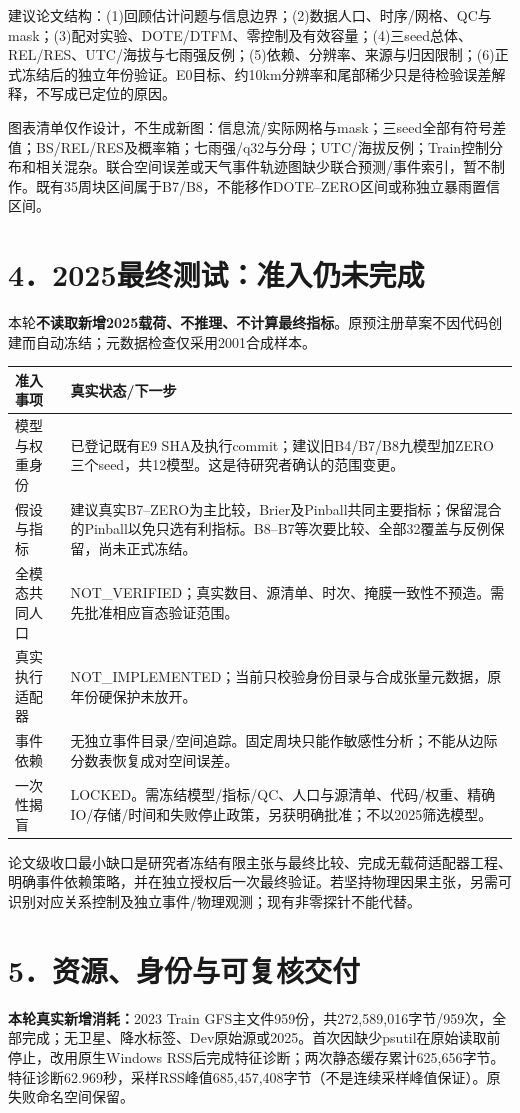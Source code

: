 \documentclass[UTF8,a4paper,10pt,fontset=none]{ctexart}
\begin{document}
建议论文结构：(1)回顾估计问题与信息边界；(2)数据人口、时序/网格、QC与mask；(3)配对实验、DOTE/DTFM、零控制及有效容量；(4)三seed总体、REL/RES、UTC/海拔与七雨强反例；(5)依赖、分辨率、来源与归因限制；(6)正式冻结后的独立年份验证。E0目标、约10km分辨率和尾部稀少只是待检验误差解释，不写成已定位的原因。

图表清单仅作设计，不生成新图：信息流/实际网格与mask；三seed全部有符号差值；BS/REL/RES及概率箱；七雨强/q32与分母；UTC/海拔反例；Train控制分布和相关混杂。联合空间误差或天气事件轨迹图缺少联合预测/事件索引，暂不制作。既有35周块区间属于B7/B8，不能移作DOTE--ZERO区间或称独立暴雨置信区间。

\section*{4．2025最终测试：准入仍未完成}
本轮\textbf{不读取新增2025载荷、不推理、不计算最终指标}。原预注册草案不因代码创建而自动冻结；元数据检查仅采用2001合成样本。

\begin{tabularx}{\linewidth}{@{}p{40mm}X@{}}
\toprule
准入事项 & 真实状态/下一步\\
\midrule
模型与权重身份 & 已登记既有E9 SHA及执行commit；建议旧B4/B7/B8九模型加ZERO三个seed，共12模型。这是待研究者确认的范围变更。\\
假设与指标 & 建议真实B7--ZERO为主比较，Brier及Pinball共同主要指标；保留混合的Pinball以免只选有利指标。B8--B7等次要比较、全部32覆盖与反例保留，尚未正式冻结。\\
全模态共同人口 & NOT\_VERIFIED；真实数目、源清单、时次、掩膜一致性不预造。需先批准相应盲态验证范围。\\
真实执行适配器 & NOT\_IMPLEMENTED；当前只校验身份目录与合成张量元数据，原年份硬保护未放开。\\
事件依赖 & 无独立事件目录/空间追踪。固定周块只能作敏感性分析；不能从边际分数表恢复成对空间误差。\\
一次性揭盲 & LOCKED。需冻结模型/指标/QC、人口与源清单、代码/权重、精确IO/存储/时间和失败停止政策，另获明确批准；不以2025筛选模型。\\
\bottomrule
\end{tabularx}

论文级收口最小缺口是研究者冻结有限主张与最终比较、完成无载荷适配器工程、明确事件依赖策略，并在独立授权后一次最终验证。若坚持物理因果主张，另需可识别对应关系控制及独立事件/物理观测；现有非零探针不能代替。
\newpage

\section*{5．资源、身份与可复核交付}
\textbf{本轮真实新增消耗：}2023 Train GFS主文件959份，共272,589,016字节/959次，全部完成；无卫星、降水标签、Dev原始源或2025。首次因缺少psutil在原始读取前停止，改用原生Windows RSS后完成特征诊断；两次静态缓存累计625,656字节。特征诊断62.969秒，采样RSS峰值685,457,408字节（不是连续采样峰值保证）。原失败命名空间保留。
\end{document}
